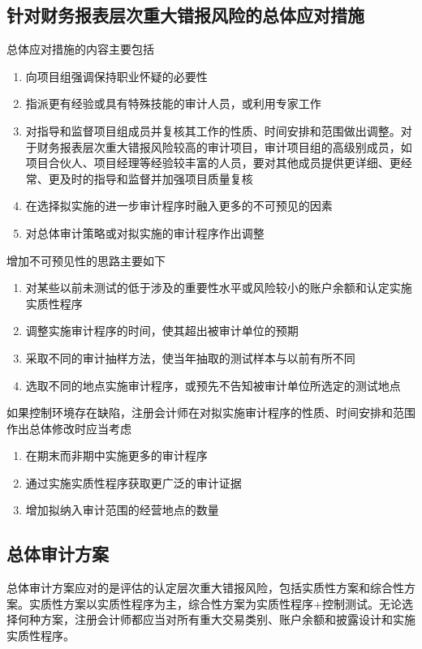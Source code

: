 \documentclass[UTF8,12pt]{ctexart}
\numberwithin{equation}{section} %
\numberwithin{figure}{section}
\numberwithin{table}{section}
\begin{document}
	\subsection{针对财务报表层次重大错报风险的总体应对措施}
	总体应对措施的内容主要包括
	\begin{enumerate}
		\item 向项目组强调保持职业怀疑的必要性
		
		\item 指派更有经验或具有特殊技能的审计人员，或利用专家工作
		
		\item 对指导和监督项目组成员并复核其工作的性质、时间安排和范围做出调整。对于财务报表层次重大错报风险较高的审计项目，审计项目组的高级别成员，如项目合伙人、项目经理等经验较丰富的人员，要对其他成员提供更详细、更经常、更及时的指导和监督并加强项目质量复核
		
		\item 在选择拟实施的进一步审计程序时融入更多的不可预见的因素
		
		\item 对总体审计策略或对拟实施的审计程序作出调整
	\end{enumerate}
	
	增加不可预见性的思路主要如下
	\begin{enumerate}
		\item 对某些以前未测试的低于涉及的重要性水平或风险较小的账户余额和认定实施实质性程序
		
		\item 调整实施审计程序的时间，使其超出被审计单位的预期
		
		\item 采取不同的审计抽样方法，使当年抽取的测试样本与以前有所不同
		
		\item 选取不同的地点实施审计程序，或预先不告知被审计单位所选定的测试地点
	\end{enumerate}
	
	如果控制环境存在缺陷，注册会计师在对拟实施审计程序的性质、时间安排和范围作出总体修改时应当考虑
	\begin{enumerate}
		\item 在期末而非期中实施更多的审计程序
		
		\item 通过实施实质性程序获取更广泛的审计证据
		
		\item 增加拟纳入审计范围的经营地点的数量
	\end{enumerate}
	
	\subsection{总体审计方案}
	总体审计方案应对的是评估的认定层次重大错报风险，包括实质性方案和综合性方案。实质性方案以实质性程序为主，综合性方案为实质性程序+控制测试。无论选择何种方案，注册会计师都应当对所有重大交易类别、账户余额和披露设计和实施实质性程序。
	
\end{document}
